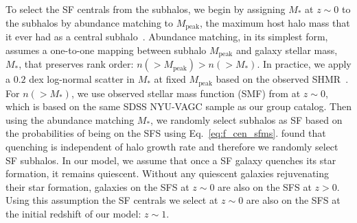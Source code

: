 \documentclass[12pt, letterpaper, preprint, tighten]{aastex62}
\begin{document}
To select the SF centrals from the subhalos, we begin by assigning $M_*$
at $z\sim 0$ to the subhalos by abundance matching to $M_\mathrm{peak}$,
the maximum host halo mass that it ever had as a central subhalo~\citep{conroy2006,vale2006,yang2009,wetzel2012,leja2013,wetzel2013,wetzel2014,hahn2017b}.
Abundance matching, in its simplest form, assumes a one-to-one mapping between subhalo
$M_\mathrm{peak}$ and galaxy stellar mass, $M_*$, that preserves rank
order: $n({>}M_\mathrm{peak}) > n({>}M_*)$. In practice, we apply a $0.2$
dex log-normal scatter in $M_*$ at fixed $M_\mathrm{peak}$ based on the
observed SHMR~\citep[\emph{e.g.}][]{mandelbaum2006a, more2011, velander2014, zu2015, gu2016, lange2018a}.
For $n({>}M_*)$, we use observed stellar mass function (SMF)
from \cite{li2009} at $z\sim 0$, which is based on the same SDSS NYU-VAGC sample as our
group catalog. Then using the abundance matching $M_*$, we randomly select subhalos as
SF based on the probabilities of being on the SFS using Eq.~\ref{eq:f_cen_sfms}.
\cite{tinker2017b,tinker2018} found that quenching is
independent of halo growth rate and therefore we randomly select SF subhalos.
In our model, we assume that once a SF galaxy quenches its star formation,
it remains quiescent.  %
Without any quiescent galaxies rejuvenating their star formation, galaxies
on the SFS at $z\sim0$ are also on the SFS at $z > 0$. Using this assumption
the SF centrals we select at $z \sim 0$ are also on the SFS at the initial
redshift of our model: $z \sim 1$.
\end{document}
